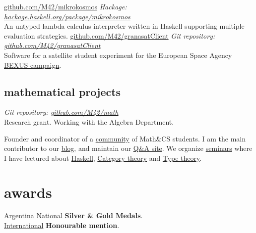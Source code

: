 \documentclass[]{friggeri-cv-a4}
\begin{document}
\begin{entrylist}
{\href{https://github.com/M42/mikrokosmos}{github.com/M42/mikrokosmos}}
{\emph{Hackage: \href{https://hackage.haskell.org/package/mikrokosmos}{hackage.haskell.org/package/mikrokosmos}} \\
  An untyped lambda calculus interpreter written in Haskell supporting multiple evaluation strategies.
}
{\href{https://github.com/M42/granasatClient}{github.com/M42/granasatClient}}
{\emph{Git repository: \href{https://github.com/M42/granasatClient}{github.com/M42/granasatClient}} \\
  Software for a satellite student experiment for the
  European Space Agency \href{http://rexusbexus.net/}{BEXUS campaign}.
}
\end{entrylist}

\subsection{mathematical projects}

\begin{entrylist}
{\emph{Git repository: \href{https://github.com/M42/math}{github.com/M42/math}} \\
  Research grant. Working with the Algebra Department.}

{ Founder and coordinator of a \href{http://tux.ugr.es/dgiim/}{community} of Math\&CS students.
  I am the main contributor to our \href{http://tux.ugr.es/dgiim/blog/}{blog},
  and maintain our \href{http://tux.ugr.es/dgiim/overflow/}{Q\&A site}.
  We organize \href{http://tux.ugr.es/dgiim/awesome/seminars/}{seminars} where I have lectured about
  \href{https://github.com/libreim/introHaskell/blob/master/introHaskell.pdf}{Haskell},
  \href{https://github.com/libreim/introCategorias/blob/master/categorias.pdf}{Category theory}
  and \href{https://github.com/libreim/curryHoward/blob/master/CurryHoward.pdf}{Type theory}.
}
\end{entrylist}


\section{awards}

\begin{entrylist}

{Argentina}
{National \textbf{Silver \& Gold Medals}. \\
\href{https://www.imo-official.org/team_r.aspx?code=ESP&year=2012}{International} \textbf{Honourable mention}.}

\end{entrylist}
\end{document}
